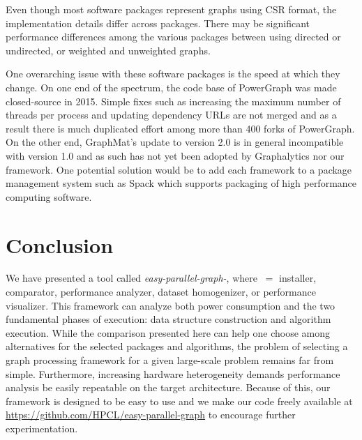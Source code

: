 \documentclass[conference]{IEEEtran}
\begin{document}
Even though most software packages represent graphs using CSR format, the implementation details differ across packages. There may be significant performance differences among the various packages between using directed or undirected, or weighted and unweighted graphs.

One overarching issue with these software packages is the speed at which they change. On one end of the spectrum, the code base of PowerGraph was made closed-source in 2015. Simple fixes such as increasing the maximum number of threads per process and updating dependency URLs are not merged and as a result there is much duplicated effort among more than 400 forks of PowerGraph. On the other end, GraphMat's update to version 2.0 is in general incompatible with version 1.0 and as such has not yet been adopted by Graphalytics nor our framework. One potential solution would be to add each framework to a package management system such as Spack \cite{Gamblin:2015:Spack} which supports packaging of high performance computing software.


\section{Conclusion}
We have presented a tool called \emph{easy-parallel-graph\mbox{-\textasteriskcentered}}, where \textasteriskcentered $\ = $ installer, comparator, performance analyzer, dataset homogenizer, or performance visualizer. This framework can analyze both power consumption and the two fundamental phases of execution: data structure construction and algorithm execution. While the comparison presented here can help one choose among alternatives for the selected packages and algorithms, the problem of selecting a graph processing framework for a given large-scale problem remains far from simple. Furthermore, increasing hardware heterogeneity demands performance analysis be easily repeatable on the target architecture. Because of this, our framework is designed to be easy to use and we make our code freely available at \url{https://github.com/HPCL/easy-parallel-graph} to encourage further experimentation.
\end{document}
